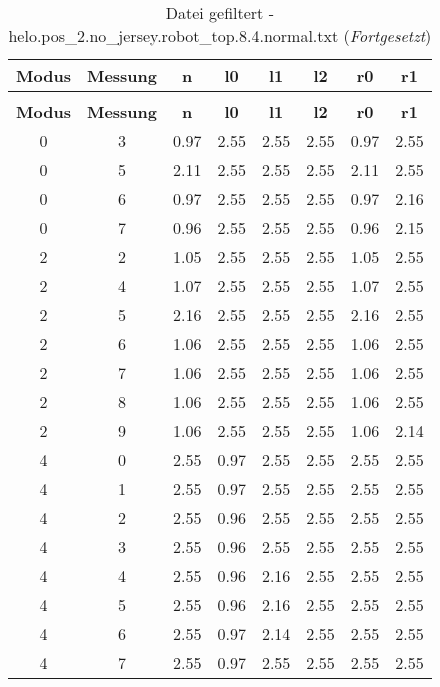 \begin{longtable}{|c|c||c||c|c|c||c|c|}
	\caption{Datei gefiltert - helo.pos\_2.no\_jersey.robot\_top.8.4.normal.txt} \label{tab:helo.pos-2.no-jersey.robot-top.8.4.normal.txt} \\ \hline
	\textbf{Modus} & \textbf{Messung} & \textbf{n} & \textbf{l0} & \textbf{l1} & \textbf{l2} & \textbf{r0} & \textbf{r1}\\ \hline
	\endfirsthead
	\caption[]{Datei gefiltert - helo.pos\_2.no\_jersey.robot\_top.8.4.normal.txt (\emph{Fortgesetzt})} \\ \hline
	\textbf{Modus} & \textbf{Messung} & \textbf{n} & \textbf{l0} & \textbf{l1} & \textbf{l2} & \textbf{r0} & \textbf{r1}\\ \hline
	\endhead
	0 & 3 & 0.97 & 2.55 & 2.55 & 2.55 & 0.97 & 2.55 \\ \hline
	0 & 5 & 2.11 & 2.55 & 2.55 & 2.55 & 2.11 & 2.55 \\ \hline
	0 & 6 & 0.97 & 2.55 & 2.55 & 2.55 & 0.97 & 2.16 \\ \hline
	0 & 7 & 0.96 & 2.55 & 2.55 & 2.55 & 0.96 & 2.15 \\ \hline
	2 & 2 & 1.05 & 2.55 & 2.55 & 2.55 & 1.05 & 2.55 \\ \hline
	2 & 4 & 1.07 & 2.55 & 2.55 & 2.55 & 1.07 & 2.55 \\ \hline
	2 & 5 & 2.16 & 2.55 & 2.55 & 2.55 & 2.16 & 2.55 \\ \hline
	2 & 6 & 1.06 & 2.55 & 2.55 & 2.55 & 1.06 & 2.55 \\ \hline
	2 & 7 & 1.06 & 2.55 & 2.55 & 2.55 & 1.06 & 2.55 \\ \hline
	2 & 8 & 1.06 & 2.55 & 2.55 & 2.55 & 1.06 & 2.55 \\ \hline
	2 & 9 & 1.06 & 2.55 & 2.55 & 2.55 & 1.06 & 2.14 \\ \hline
	4 & 0 & 2.55 & 0.97 & 2.55 & 2.55 & 2.55 & 2.55 \\ \hline
	4 & 1 & 2.55 & 0.97 & 2.55 & 2.55 & 2.55 & 2.55 \\ \hline
	4 & 2 & 2.55 & 0.96 & 2.55 & 2.55 & 2.55 & 2.55 \\ \hline
	4 & 3 & 2.55 & 0.96 & 2.55 & 2.55 & 2.55 & 2.55 \\ \hline
	4 & 4 & 2.55 & 0.96 & 2.16 & 2.55 & 2.55 & 2.55 \\ \hline
	4 & 5 & 2.55 & 0.96 & 2.16 & 2.55 & 2.55 & 2.55 \\ \hline
	4 & 6 & 2.55 & 0.97 & 2.14 & 2.55 & 2.55 & 2.55 \\ \hline
	4 & 7 & 2.55 & 0.97 & 2.55 & 2.55 & 2.55 & 2.55 \\ \hline

\end{longtable}
